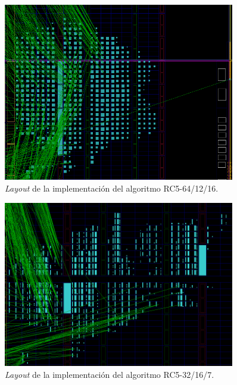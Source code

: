 \begin{figure}[H]
	\centering
	\includegraphics[width=0.9\textwidth]{./images/fig64_12_16_layout}
	\caption{\textit{Layout} de la implementación del algoritmo RC5-64/12/16.}
	\label{fig64_12_16_layout}
\end{figure}
\begin{figure}[H]
	\centering
	\includegraphics[width=0.9\textwidth]{./images/fig32_16_7_layout}
	\caption{\textit{Layout} de la implementación del algoritmo RC5-32/16/7.}
	\label{fig32_16_7_layout}
\end{figure}

